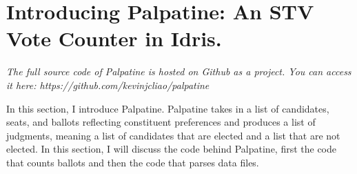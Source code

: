 \chapter{Introducing Palpatine: An STV Vote Counter in Idris.}

\textit{The full source code of Palpatine is hosted on Github as a project. 
You can access it here: https://github.com/kevinjcliao/palpatine}

In this section, I introduce Palpatine. Palpatine takes in a list of candidates,
seats, and ballots reflecting constituent preferences and produces a list of
judgments, meaning a list of candidates that are elected and a list that are not
elected. In this section, I will discuss the code behind Palpatine, first the
code that counts ballots and then the code that parses data files. 


\clearpage

\clearpage

\clearpage

